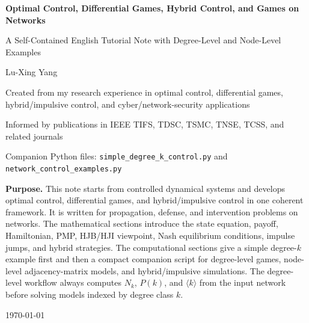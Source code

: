 \documentclass[11pt,a4paper]{article}
\begin{document}
\begin{titlepage}
\centering
\vspace*{1.5cm}
{\sffamily\bfseries\Huge\color{DeakinBlue} Optimal Control, Differential Games, Hybrid Control, and Games on Networks\par}
\vspace{0.5cm}
{\sffamily\Large A Self-Contained English Tutorial Note with Degree-Level and Node-Level Examples\par}
\vspace{0.8cm}
{\large Lu-Xing Yang\par}
\vspace{0.8cm}
{\large Created from my research experience in optimal control, differential games, hybrid/impulsive control, and cyber/network-security applications\par}
\vspace{0.35cm}
{\large Informed by publications in IEEE TIFS, TDSC, TSMC, TNSE, TCSS, and related journals\par}
\vspace{0.35cm}
{\large Companion Python files: \texttt{simple\_degree\_k\_control.py} and \texttt{network\_control\_examples.py}\par}
\vfill
\begin{tcolorbox}[width=0.86\textwidth,colback=SoftBlue,colframe=DeakinBlue]
\textbf{Purpose.} This note starts from controlled dynamical systems and develops optimal control, differential games, and hybrid/impulsive control in one coherent framework. It is written for propagation, defense, and intervention problems on networks. The mathematical sections introduce the state equation, payoff, Hamiltonian, PMP, HJB/HJI viewpoint, Nash equilibrium conditions, impulse jumps, and hybrid strategies. The computational sections give a simple degree-$k$ example first and then a compact companion script for degree-level games, node-level adjacency-matrix models, and hybrid/impulsive simulations. The degree-level workflow always computes $N_k$, $P(k)$, and $\langle k\rangle$ from the input network before solving models indexed by degree class $k$.
\end{tcolorbox}
\vfill
{\large \today\par}
\end{titlepage}

\tableofcontents
\newpage
\end{document}
